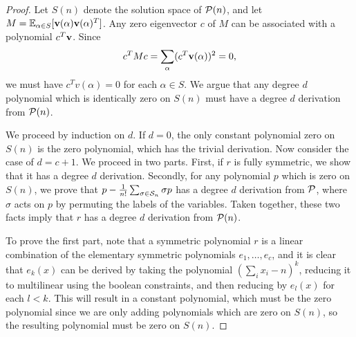 \begin{proof}
Let $S(n)$ denote the solution space of $\mathcal P(n)$, and let $M = \operatorname*{\mathbb{E}}_{\alpha \in S}[{\bf v}(\alpha){\bf v}(\alpha)^T]$. Any zero eigenvector $c$ of $M$ can be associated with a polynomial $c^T{\bf v}$. Since 
\[c^TMc = \sum_\alpha (c^T{\bf v}(\alpha))^2 = 0,\]
we must have $c^Tv(\alpha) = 0$ for each $\alpha \in S$. We argue that any degree $d$ polynomial which is identically zero on $S(n)$ must have a degree $d$ derivation from $\mathcal P(n)$. 

We proceed by induction on $d$. If $d = 0$, the only constant polynomial zero on $S(n)$ is the zero polynomial, which has the trivial derivation. Now consider the case of $d = c+1$. We proceed in two parts. First, if $r$ is fully symmetric, we show that it has a degree $d$ derivation. Secondly, for any polynomial $p$ which is zero on $S(n)$, we prove that $p - \frac{1}{n!}\sum_{\sigma \in \mathcal S_n} \sigma p$ has a degree $d$ derivation from $\mathcal P$, where $\sigma$ acts on $p$ by permuting the labels of the variables. Taken together, these two facts imply that $r$ has a degree $d$ derivation from $\mathcal P(n)$.

To prove the first part, note that a symmetric polynomial $r$ is a linear combination of the elementary symmetric polynomials $e_1,\dots,e_c$, and it is clear that $e_k(x)$ can be derived by taking the polynomial $(\sum_i x_i - n)^k$, reducing it to multilinear using the boolean constraints, and then reducing by $e_l(x)$ for each $l < k$. This will result in a constant polynomial, which must be the zero polynomial since we are only adding polynomials which are zero on $S(n)$, so the resulting polynomial must be zero on $S(n)$. 


\end{proof}
